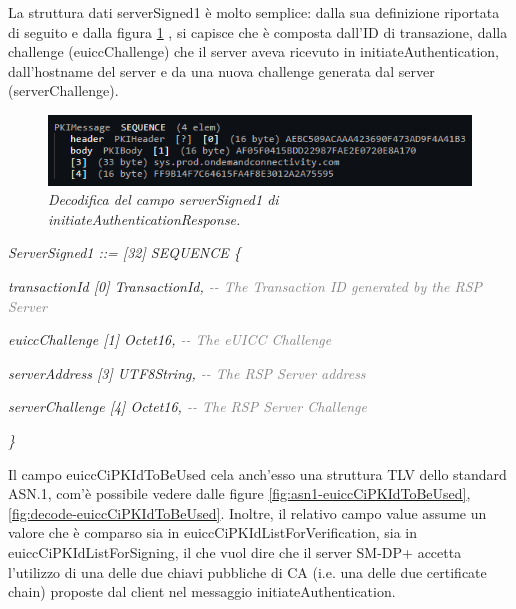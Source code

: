 \documentclass[10pt, oneside]{book}
\begin{document}
La struttura dati serverSigned1 è molto semplice: dalla sua definizione riportata di seguito e dalla figura \ref{fig:decode-serverSigned1} \cite{RSP-definitions}, si capisce che è composta dall'ID di transazione, dalla challenge (euiccChallenge) che il server aveva ricevuto in initiateAuthentication, dall'hostname del server e da una nuova challenge generata dal server (serverChallenge).\\
\begin{figure}
\includegraphics[width=\linewidth]{decode-serverSigned1.png}
\caption{\textit{Decodifica del campo serverSigned1 di initiateAuthenticationResponse.}}
\label{fig:decode-serverSigned1}
\end{figure}

\textit{ServerSigned1 ::= [32] SEQUENCE \{}

\hspace{0.75cm} \textit{transactionId [0] TransactionId, \textcolor{gray}{{-}{-} The Transaction ID generated by the RSP Server}}

\hspace{0.75cm} \textit{euiccChallenge [1] Octet16, \textcolor{gray}{{-}{-} The eUICC Challenge}}

\hspace{0.75cm} \textit{serverAddress [3] UTF8String, \textcolor{gray}{{-}{-} The RSP Server address}}

\hspace{0.75cm} \textit{serverChallenge [4] Octet16, \textcolor{gray}{{-}{-} The RSP Server Challenge}}

\textit{\}\\}

Il campo euiccCiPKIdToBeUsed cela anch'esso una struttura TLV dello standard ASN.1, com'è possibile vedere dalle figure \ref{fig:asn1-euiccCiPKIdToBeUsed}, \ref{fig:decode-euiccCiPKIdToBeUsed}. Inoltre, il relativo campo value assume un valore che è comparso sia in euiccCiPKIdListForVerification, sia in euiccCiPKIdListForSigning, il che vuol dire che il server SM-DP+ accetta l'utilizzo di una delle due chiavi pubbliche di CA (i.e. una delle due certificate chain) proposte dal client nel messaggio initiateAuthentication.\\
\end{document}
